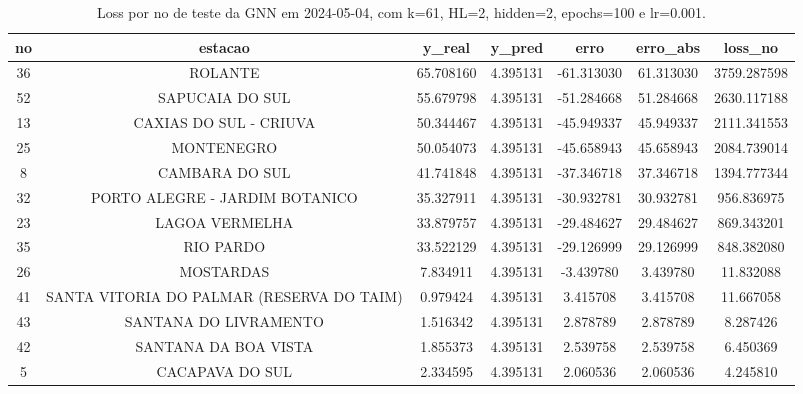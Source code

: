 \begin{table}[h]
\centering
\caption{Loss por no de teste da GNN em 2024-05-04, com k=61, HL=2, hidden=2, epochs=100 e lr=0.001.}
\label{tab:gnn_loss_k61_hl2_h2_e100_d20240504}
\begin{tabular}{ccccccc}
\toprule
no & estacao & y\_real & y\_pred & erro & erro\_abs & loss\_no \\
\midrule
36 & ROLANTE & 65.708160 & 4.395131 & -61.313030 & 61.313030 & 3759.287598 \\
52 & SAPUCAIA DO SUL & 55.679798 & 4.395131 & -51.284668 & 51.284668 & 2630.117188 \\
13 & CAXIAS DO SUL - CRIUVA & 50.344467 & 4.395131 & -45.949337 & 45.949337 & 2111.341553 \\
25 & MONTENEGRO & 50.054073 & 4.395131 & -45.658943 & 45.658943 & 2084.739014 \\
8 & CAMBARA DO SUL & 41.741848 & 4.395131 & -37.346718 & 37.346718 & 1394.777344 \\
32 & PORTO ALEGRE - JARDIM BOTANICO & 35.327911 & 4.395131 & -30.932781 & 30.932781 & 956.836975 \\
23 & LAGOA VERMELHA & 33.879757 & 4.395131 & -29.484627 & 29.484627 & 869.343201 \\
35 & RIO PARDO & 33.522129 & 4.395131 & -29.126999 & 29.126999 & 848.382080 \\
26 & MOSTARDAS & 7.834911 & 4.395131 & -3.439780 & 3.439780 & 11.832088 \\
41 & SANTA VITORIA DO PALMAR (RESERVA DO TAIM) & 0.979424 & 4.395131 & 3.415708 & 3.415708 & 11.667058 \\
43 & SANTANA DO LIVRAMENTO & 1.516342 & 4.395131 & 2.878789 & 2.878789 & 8.287426 \\
42 & SANTANA DA BOA VISTA & 1.855373 & 4.395131 & 2.539758 & 2.539758 & 6.450369 \\
5 & CACAPAVA DO SUL & 2.334595 & 4.395131 & 2.060536 & 2.060536 & 4.245810 \\
\bottomrule
\end{tabular}
\end{table}
